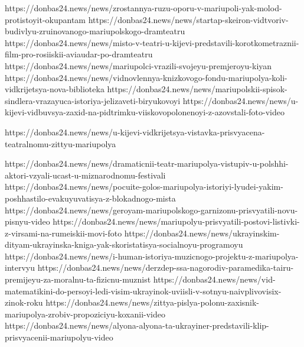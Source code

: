  
 
 
 
 


https://donbas24.news/news/zrostannya-ruzu-oporu-v-mariupoli-yak-molod-protistoyit-okupantam
https://donbas24.news/news/startap-skeiron-vidtvoriv-budivlyu-zruinovanogo-mariupolskogo-dramteatru
https://donbas24.news/news/misto-v-teatri-u-kijevi-predstavili-korotkometraznii-film-pro-rosiiskii-aviaudar-po-dramteatru
https://donbas24.news/news/mariupolci-vrazili-svojeyu-premjeroyu-kiyan
https://donbas24.news/news/vidnovlennya-knizkovogo-fondu-mariupolya-koli-vidkrijetsya-nova-biblioteka
https://donbas24.news/news/mariupolskii-spisok-sindlera-vrazayuca-istoriya-jelizaveti-biryukovoyi
https://donbas24.news/news/u-kijevi-vidbuvsya-zaxid-na-pidtrimku-viiskovopolonenoyi-z-azovstali-foto-video

https://donbas24.news/news/u-kijevi-vidkrijetsya-vistavka-prisvyacena-teatralnomu-zittyu-mariupolya

https://donbas24.news/news/dramaticnii-teatr-mariupolya-vistupiv-u-polshhi-aktori-vzyali-ucast-u-miznarodnomu-festivali
https://donbas24.news/news/pocuite-golos-mariupolya-istoriyi-lyudei-yakim-poshhastilo-evakuyuvatisya-z-blokadnogo-mista
https://donbas24.news/news/geroyam-mariupolskogo-garnizonu-prisvyatili-novu-pisnyu-video
https://donbas24.news/news/mariupolyu-prisvyatili-postovi-listivki-z-virsami-na-rumeiskii-movi-foto
https://donbas24.news/news/ukrayinskim-dityam-ukrayinska-kniga-yak-skoristatisya-socialnoyu-programoyu
https://donbas24.news/news/i-human-istoriya-muzicnogo-projektu-z-mariupolya-intervyu
https://donbas24.news/news/derzdep-ssa-nagorodiv-paramedika-tairu-premijeyu-za-moralnu-ta-fizicnu-muznist
https://donbas24.news/news/vid-matematikini-do-persoyi-ledi-visim-ukrayinok-uviisli-v-sotnyu-naivplivovisix-zinok-roku
https://donbas24.news/news/zittya-pislya-polonu-zaxisnik-mariupolya-zrobiv-propoziciyu-koxanii-video
https://donbas24.news/news/alyona-alyona-ta-ukrayiner-predstavili-klip-prisvyacenii-mariupolyu-video

